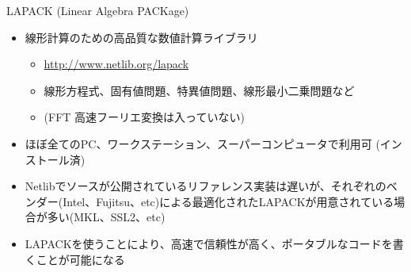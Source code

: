 \begin{frame}[t,fragile]{LAPACK (Linear Algebra PACKage)}
  \begin{itemize}
  \item 線形計算のための高品質な数値計算ライブラリ
    \begin{itemize}
    \item \url{http://www.netlib.org/lapack}
    \item 線形方程式、固有値問題、特異値問題、線形最小二乗問題など
    \item (FFT 高速フーリエ変換は入っていない)
    \end{itemize}
  \item ほぼ全てのPC、ワークステーション、スーパーコンピュータで利用可 (インストール済)
  \item Netlibでソースが公開されているリファレンス実装は遅いが、それぞれのベンダー(Intel、Fujitsu、etc)による最適化されたLAPACKが用意されている場合が多い(MKL、SSL2、etc)
  \item LAPACKを使うことにより、高速で信頼性が高く、ポータブルなコードを書くことが可能になる
  \end{itemize}
\end{frame}
